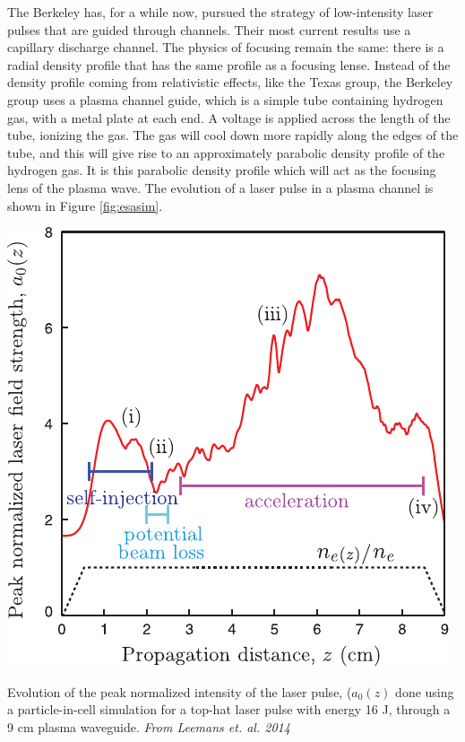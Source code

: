 \documentclass[12pt,letter]{article}
\begin{document}
The Berkeley has, for a while now, pursued the strategy of low-intensity laser
pulses that are guided through channels. Their most current results use a
capillary discharge channel. The physics of focusing remain the same: there is a
radial density profile that has the same profile as a focusing lense. Instead of
the density profile coming from relativistic effects, like the Texas group, the
Berkeley group uses a plasma channel guide, which is a simple tube containing
hydrogen gas, with a metal plate at each end. A voltage is applied across the
length of the tube, ionizing the gas. The gas will cool down more rapidly along
the edges of the tube, and this will give rise to an approximately parabolic
density profile of the hydrogen
gas\cite{PhysRevLett.89.185003,PhysRevE.63.015401}. It is this parabolic density profile which
will act as the focusing lens of the plasma wave. The evolution of a laser pulse
in a plasma channel is shown in Figure \ref{fig:esasim}. 
\begin{marginfigure}
	\includegraphics[width=\marginparwidth]{../figures/esareycapfield.pdf}
    \caption{Evolution of the peak normalized intensity of the laser pulse,
    ($a_0(z)$ done using a particle-in-cell simulation for a top-hat laser pulse
    with energy 16 J, through a 9 \si{cm} plasma waveguide. {\em From Leemans
et. al. 2014 \cite{PhysRevLett.113.245002}}\label{fig:esasim}}
\end{marginfigure}
\end{document}
